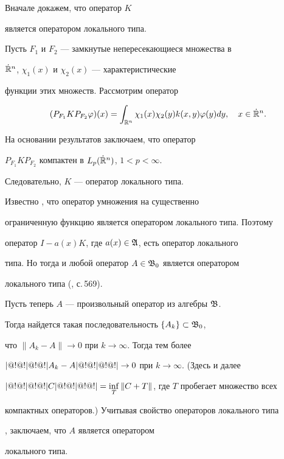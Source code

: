\begin{pf}


Вначале докажем, что оператор $K$


является оператором локального типа.


Пусть $F_1$ и $F_2$ --- замкнутые непересекающиеся множества в


$\Dot{\Bbb R}^n$, $\chi_1(x)$ и $\chi_2(x)$ --- характеристические


функции этих множеств. Рассмотрим оператор


$$


(P_{F_1}KP_{F_2}\varphi)(x)=


\int_{\Bbb R^n}\chi_1(x)\chi_2(y)k(x,y)\varphi(y)dy,\quad


x\in\Dot{\Bbb R}^n.


$$


На основании результатов \cite{b2} заключаем, что оператор


$P_{F_1}KP_{F_2}$ компактен в $L_p(\Dot{\Bbb R}^n)$, $1<p<\infty$.


Следовательно, $K$ --- оператор локального типа.





Известно \cite{b4}, что оператор умножения на существенно


ограниченную функцию является оператором локального типа. Поэтому


оператор $I-a(x)K$, где $a(x)\in\frak A$, есть оператор локального


типа. Но тогда и любой оператор $A\in\frak B_0$ является оператором


локального типа (\cite{b4}, с.\,569).





Пусть теперь $A$ --- произвольный оператор из алгебры $\frak B$.


Тогда найдется такая последовательность $\{A_k\}\subset\frak B_0$,


что $\|A_k-A\|\to 0$ при $k\to\infty$. Тогда тем более


$|@!@!|@!@!| A_k-A|@!@!|@!@!|\to0$ при $k\to\infty$. (Здесь и далее


$|@!@!|@!@!| C|@!@!|@!@!|=\inf\limits_T\|C+T\|$, где $T$ пробегает множество всех


компактных операторов.) Учитывая свойство операторов локального типа


\cite{b4}, заключаем, что $A$ является оператором


локального типа.


\end{pf}





